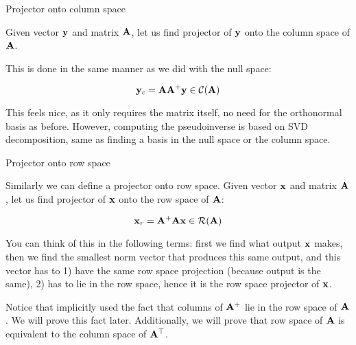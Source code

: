 \documentclass{beamer}
\begin{document}
\begin{frame}{Projector onto column space}
\begin{flushleft}

Given vector $\mathbf{y}$ and matrix $\mathbf{A}$, let us find projector of $\mathbf{y}$ onto the column space of $\mathbf{A}$.

\bigskip

This is done in the same manner as we did with the null space:

\begin{equation}
    \mathbf{y}_c = \mathbf{A}\mathbf{A}^+ \mathbf{y} \in \mathcal{C}(\mathbf{A})
\end{equation}

This feels nice, as it only requires the matrix itself, no need for the orthonormal basis as before. However, computing the pseudoinverse is based on SVD decomposition, same as finding a basis in the null space or the column space.

\end{flushleft}
\end{frame}



\begin{frame}{Projector onto row space}
\begin{flushleft}

Similarly we can define a projector onto row space. Given vector $\mathbf{x}$ and matrix $\mathbf{A}$, let us find projector of $\mathbf{x}$ onto the row space of $\mathbf{A}$:

\begin{equation}
    \mathbf{x}_r = \mathbf{A}^+\mathbf{A} \mathbf{x} \in \mathcal{R}(\mathbf{A})
\end{equation}

You can think of this in the following terms: first we find what output $\mathbf{x}$ makes, then we find the smallest norm vector that produces this same output, and this vector has to 1) have the same row space projection (because output is the same), 2) has to lie in the row space, hence it is the row space projector of $\mathbf{x}$.

\bigskip

Notice that implicitly used the fact that columns of $\mathbf{A}^+$ lie in the row space of $\mathbf{A}$. We will prove this fact later. Additionally, we will prove that row space of $\mathbf{A}$ is equivalent to the column space of $\mathbf{A}^\top$.

\end{flushleft}
\end{frame}
\end{document}
